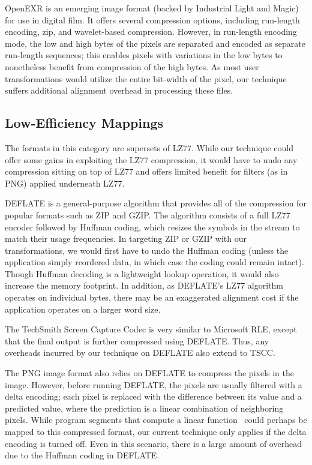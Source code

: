  OpenEXR is an emerging image format (backed by
  Industrial Light and Magic) for use in digital film.  It offers
  several compression options, including run-length encoding, zip, and
  wavelet-based compression.  However, in run-length encoding mode,
  the low and high bytes of the pixels are separated and encoded as
  separate run-length sequences; this enables pixels with variations
  in the low bytes to nonetheless benefit from compression of the high
  bytes.  As most user transformations would utilize the entire
  bit-width of the pixel, our technique suffers additional alignment
  overhead in processing these files.

\myend

\subsection*{Low-Efficiency Mappings}
\label{sec:formats-bad}

The formats in this category are supersets of LZ77.  While our
technique could offer some gains in exploiting the LZ77 compression,
it would have to undo any compression sitting on top of LZ77 and
offers limited benefit for filters (as in PNG) applied underneath
LZ77.

\mybegin

  DEFLATE is a general-purpose algorithm that
  provides all of the compression for popular formats such as ZIP and
  GZIP.  The algorithm consists of a full LZ77 encoder followed by
  Huffman coding, which resizes the symbols in the stream to match
  their usage frequencies.  In targeting ZIP or GZIP with our
  transformations, we would first have to undo the Huffman coding
  (unless the application simply reordered data, in which case the
  coding could remain intact).  Though Huffman decoding is a
  lightweight lookup operation, it would also increase the memory
  footprint.  In addition, as DEFLATE's LZ77 algorithm operates on
  individual bytes, there may be an exaggerated alignment cost if the
  application operates on a larger word size.

  The TechSmith Screen Capture Codec is very similar
  to Microsoft RLE, except that the final output is further compressed
  using DEFLATE.  Thus, any overheads incurred by our technique on
  DEFLATE also extend to TSCC.

  The PNG image format also relies on DEFLATE to
  compress the pixels in the image.  However, before running DEFLATE,
  the pixels are usually filtered with a delta encoding; each pixel is
  replaced with the difference between its value and a predicted
  value, where the prediction is a linear combination of neighboring
  pixels.  While program segments that compute a linear
  function~\cite{lamb-pldi03} could perhaps be mapped to this compressed
  format, our current technique only applies if the delta encoding is
  turned off.  Even in this scenario, there is a large amount of
  overhead due to the Huffman coding in DEFLATE.

